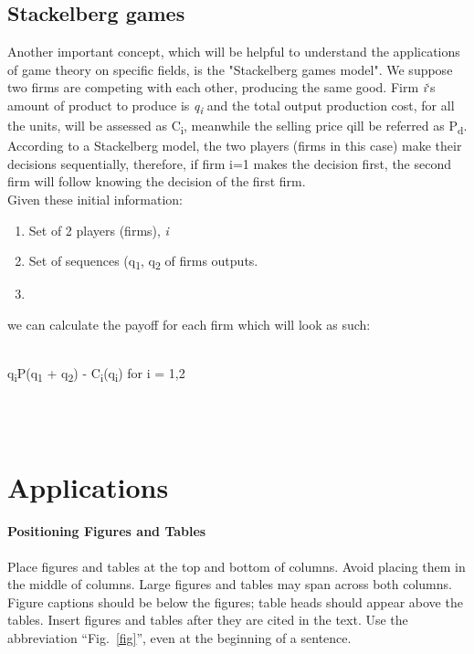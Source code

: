\documentclass[conference]{IEEEtran}
\begin{document}
\subsection{Stackelberg games}
Another important concept, which will be helpful to understand the applications of game theory on specific fields, is the "Stackelberg games model".
We suppose two firms are competing with each other, producing the same good. Firm \textit{i}`s amount of product to produce is \textit{q\textsubscript{i}} and the total output production cost, for all the units, will be assessed as C\textsubscript{i}, meanwhile the selling price qill be referred as P\textsubscript{d}. According to a Stackelberg model, the two players (firms in this case) make their decisions sequentially, therefore, if firm i=1 makes the decision first, the second firm will follow knowing the decision of the first firm.\\
Given these initial information:
\begin{enumerate}
\item Set of 2 players (firms), \textit{i}
\item Set of sequences (q\textsubscript{1}, q\textsubscript{2} of firms outputs.
\item 
\end{enumerate}

 we can calculate the payoff for each firm which will look as such:\\\\
\centerline{q\textsubscript{i}P(q\textsubscript{1} + q\textsubscript{2}) - C\textsubscript{i}(q\textsubscript{i}) for i = 1,2}\\\\

\section{Applications}
\paragraph{Positioning Figures and Tables} Place figures and tables at the top and 
bottom of columns. Avoid placing them in the middle of columns. Large 
figures and tables may span across both columns. Figure captions should be 
below the figures; table heads should appear above the tables. Insert 
figures and tables after they are cited in the text. Use the abbreviation 
``Fig.~\ref{fig}'', even at the beginning of a sentence.
\end{document}

